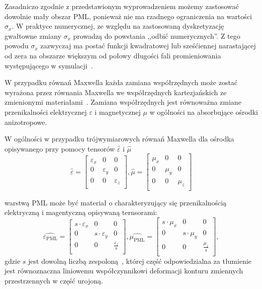 Zasadniczo zgodnie z przedstawionym wyprowadzeniem możemy zastosować dowolnie mały obszar PML, ponieważ nie ma rzadnego ograniczenia na wartości $\sigma_x$. W praktyce numerycznej, ze względu na zastosowaną dyskretyzację gwałtowne zmiany $\sigma_x$ prowadzą do powstania ,,odbić numerycznych''. Z tego powodu $\sigma_x$ zazwyczaj ma postać funkcji kwadratowej lub sześćiennej narastającej od zera na obszarze większym od połowy długości fali promieniowania występującego w symulacji~\cite{johnson2008notes}.

W przypadku równań Maxwella każda zamiana współrzędnych może zostać wyrażona przez równania Maxwella we współrzędnych kartezjańskich ze zmienionymi materiałami~\cite{ward1996refraction}. Zamiana współrzędnych jest równoważna zmiane przenikalności elektrycznej $\varepsilon$ i magnetycznej $\mu$ w ogólności na absorbujące ośrodki anizotropowe. 

W ogólności w przypadku trójwymiarowych równań Maxwella dla ośrodka opisywanego przy pomocy tensorów $\hat{\varepsilon}$ i $\hat{\mu}$ 
\begin{equation}
\hat{\varepsilon}=
\begin{bmatrix}
\varepsilon_x & 0 & 0 \\
0 &\varepsilon_y & 0 \\
0 & 0  & \varepsilon_z  \\
\end{bmatrix}
, \hat{\mu}=
\begin{bmatrix}
\mu_x & 0 & 0 \\
0 &\mu_y & 0 \\
0 & 0  & \mu_z  \\
\end{bmatrix}
\end{equation}

warstwą PML może być materiał o charakteryzujący się przenikalnością elektryczną i magentyczną opisywaną ternsorami:
\begin{equation}
\hat{\varepsilon_{\textrm{PML}}}=
\begin{bmatrix}
s \cdot \varepsilon_x & 0 & 0 \\
0 &s \cdot \varepsilon_y & 0 \\
0 & 0  & \frac{ \varepsilon_z}{s}  \\
\end{bmatrix}
, \hat{\mu_{\textrm{PML}}}=
\begin{bmatrix}
s \cdot \mu_x & 0 & 0 \\
0 & s \cdot \mu_y & 0 \\
0 & 0  & \frac{\mu_z}{s}  \\
\end{bmatrix},
\label{eq:general-pml-form}
\end{equation}
gdzie $s$ jest dowolną liczbą zespoloną~\cite{sacks1995perfectly}, której część odpowiedzialna za tłumienie jest równoznaczna liniowemu współczynnikowi deformacji konturu zmiennych przestrzennych w część urojoną.


